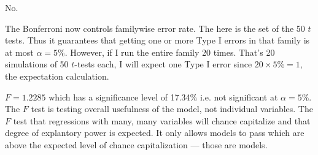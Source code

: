 \documentclass[12pt]{article}
\begin{document}
\begin{enumerate}
No.


The Bonferroni now controls familywise error rate. The  here is the set of the 50 $t$ tests. Thus it guarantees that getting one or more Type I errors in that family is at most $\alpha = 5\%$. However, if I run the entire family 20 times. That's 20 simulations of 50 $t$-tests each, I will expect one Type I error since $20 \times 5\% = 1$, the expectation calculation.


$F = 1.2285$ which has a significance level of 17.34\% i.e. not significant at $\alpha = 5\%$. The $F$ test is testing overall usefulness of the model, not individual variables. The $F$ test  that regressions with many, many variables will chance capitalize and that degree of explantory power is expected. It only allows models to pass which are above the expected level of chance capitalization --- those are  models.

\end{enumerate}

\end{document}
